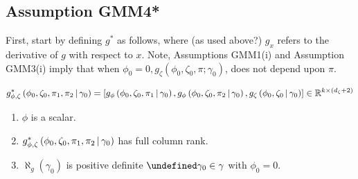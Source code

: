 \documentclass[11pt]{article}
\newcommand*{\R}{\mathbb{R}}
\let\oldforall\forall
\let\forall\undefined
\DeclareMathOperator{\forall}{\oldforall}
\newcommand{\mvert}[1][\middle]{\ensuremath{\,#1\vert\,}}
\begin{document}
\subsection{Assumption GMM4*}


First, start by defining $g^{*}$ as follows, where (as used above?) $g_{x}$ refers to the derivative of $g$ with
respect to $x$.
Note, Assumptions GMM1(i) and Assumption GMM3(i) imply that when $\phi_0 = 0, g_{\zeta}\left(\phi_0, \zeta_0,
\pi ; \gamma_0\right)$, does not depend upon $\pi$.

\begin{equation}
    g_{\phi, \zeta}^{*}\left(\phi_0, \zeta_0, \pi_1, \pi_2 \mvert \gamma_0\right)  =
    \left[g_{\phi}\left(\phi_0, \zeta_0, \pi_1 \mvert \gamma_0\right)  , g_{\phi}\left(\phi_0, \zeta_0, \pi_2
    \mvert \gamma_0\right) , g_{\zeta} \left(\phi_0, \zeta_0 \mvert \gamma_0\right)  \right]  \in \R^{k \times
    (d_{\zeta} + 2)}
\end{equation}


\begin{enumerate}
    \item $\phi$ is a scalar.
    \item $g_{\phi, \zeta}^{*}\left(\phi_0, \zeta_0, \pi_1, \pi_2 \mvert \gamma_0\right)$ has full column rank. 
    \item $\aleph_g(\gamma_0)$ is positive definite $\forall \gamma_0 \in \gamma $ with $\phi_0 = 0$. 
\end{enumerate}






\printbibliography
\end{document}
